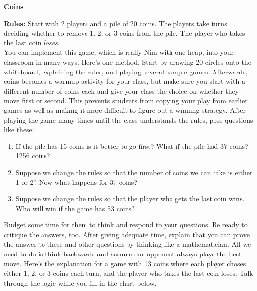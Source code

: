 \documentclass[12pt]{article}
\begin{document}
\begin{center}
\Large{\textbf{Coins}}
\end{center}
\textbf{Rules:} Start with 2 players and a pile of 20 coins.
The players take turns deciding whether to remove 1, 2, or 3 coins 
from the pile. The player who takes the last coin \emph{loses}. \\

You can implement this game, which is really Nim with one heap,
into your classroom in many ways. Here's one method. Start by
drawing 20 circles onto the whiteboard, explaining the rules, and  
playing several sample games. Afterwards, coins becomes a 
warmup activity for your class, but make sure you start with a 
different number of coins each and give your class the choice on 
whether they move first or second. This prevents students from 
copying your play from earlier games as well as making it more 
difficult to figure out a winning strategy. After playing the game 
many times until the class understands the rules, pose questions
like these:
\begin{enumerate}
\item If the pile has 15 coins is it better to go first? What if the 
pile had 37 coins? 1256 coins?
\item Suppose we change the rules so that the number of coins
we can take is either 1 or 2? Now what happens for 37 coins?
\item Suppose we change the rules so that the player who gets 
the last coin wins. Who will win if the game has 53 coins?
\end{enumerate}

Budget some time for them to think and respond to your questions.
Be ready to critique the answers, too. After giving adequate time,
explain that you can prove the answer to these and other questions
by thinking like a mathematician. All we need to do is think 
backwards and assume our opponent always plays the best move.
Here's the explanation for a game with 13 coins where each
player choses either 1, 2, or 3 coins each turn, and the player who
takes the last coin loses. Talk through the logic while you 
fill in the chart below.
\end{document}
